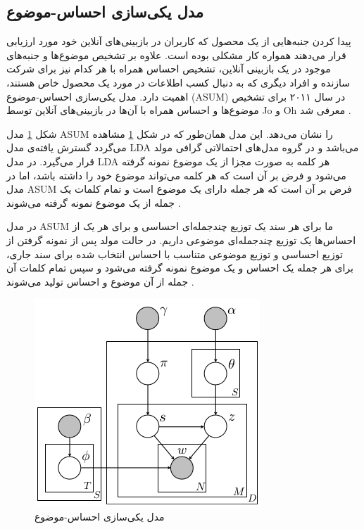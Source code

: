 	\subsection{مدل یکی‌سازی احساس-موضوع}
	\label{chap3sec4sub2}
	
	پیدا کردن جنبه‌هایی از یک محصول که کاربران در بازبینی‌های آنلاین خود مورد ارزیابی قرار می‌‌دهند همواره کار مشکلی‌ بوده است. علاوه بر تشخیص موضوع‌ها و جنبه‌های موجود در یک بازبینی آنلاین، تشخیص احساس همراه با هر کدام نیز برای شرکت سازنده و افراد دیگری که به دنبال کسب اطلاعات در مورد یک محصول خاص هستند، اهمیت دارد. مدل یکی‌سازی احساس-موضوع
	(ASUM)
	در سال ۲۰۱۱ برای تشخیص موضوع‌ها و احساس همراه با آن‌ها در بازبینی‌های آنلاین توسط
	Jo
	و
	Oh
	معرفی‌ شد
	\cite{jo2011aspect}.
	
	شکل
	\ref{chap3-fig9}
	مدل
	ASUM
	را نشان می‌‌دهد. این مدل همان‌طور که در شکل
	\ref{chap3-fig9}
	مشاهده می‌‌گردد گسترش یافته‌ی مدل
	LDA
	می‌باشد
	\cite{jo2011aspect}
	و در گروه مدل‌های احتمالاتی گرافی‌ مولد قرار می‌‌گیرد. در مدل
	LDA
	هر کلمه به صورت مجزا از یک موضوع نمونه گرفته می‌‌شود و فرض بر آن است که هر کلمه می‌‌تواند موضوع خود را داشته باشد، اما در مدل
	ASUM
	فرض بر آن است که هر جمله دارای یک موضوع است و تمام کلمات یک جمله از یک موضوع نمونه گرفته می‌‌شوند
	\cite{jo2011aspect}.
	
در مدل
ASUM
ما برای هر سند یک توزیع چندجمله‌ای احساسی‌ و برای هر یک از احساس‌ها یک توزیع چندجمله‌ای موضوعی داریم. در حالت مولد پس از نمونه گرفتن از توزیع احساسی‌ و توزیع موضوعی متناسب با احساس انتخاب شده برای سند جاری، برای هر جمله یک احساس و یک موضوع نمونه گرفته ‌می‌‌شود و سپس تمام کلمات آن جمله از آن موضوع و احساس تولید می‌‌شوند
\cite{jo2011aspect}.

\begin{figure}[!t]
	\centering
	\includegraphics[scale=0.5]{chap3-img/ASUM}
	\caption{مدل یکی‌سازی احساس-موضوع \cite{jo2011aspect}}
	\label{chap3-fig9}
\end{figure}



